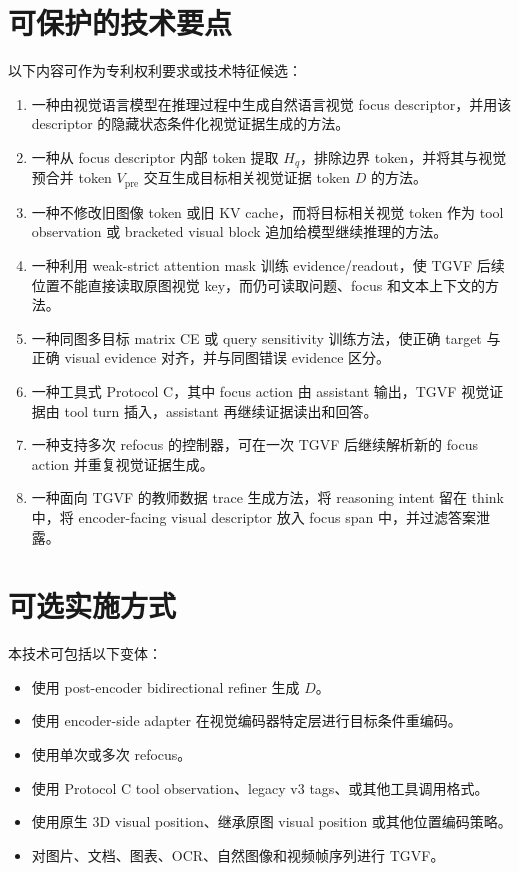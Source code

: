 \documentclass[10pt,twocolumn]{ctexart}
\begin{document}
\section{可保护的技术要点}

以下内容可作为专利权利要求或技术特征候选：

\begin{enumerate}
  \item 一种由视觉语言模型在推理过程中生成自然语言视觉 focus descriptor，并用该 descriptor 的隐藏状态条件化视觉证据生成的方法。
  \item 一种从 focus descriptor 内部 token 提取 $H_q$，排除边界 token，并将其与视觉预合并 token $V_{\mathrm{pre}}$ 交互生成目标相关视觉证据 token $D$ 的方法。
  \item 一种不修改旧图像 token 或旧 KV cache，而将目标相关视觉 token 作为 tool observation 或 bracketed visual block 追加给模型继续推理的方法。
  \item 一种利用 weak-strict attention mask 训练 evidence/readout，使 TGVF 后续位置不能直接读取原图视觉 key，而仍可读取问题、focus 和文本上下文的方法。
  \item 一种同图多目标 matrix CE 或 query sensitivity 训练方法，使正确 target 与正确 visual evidence 对齐，并与同图错误 evidence 区分。
  \item 一种工具式 Protocol C，其中 focus action 由 assistant 输出，TGVF 视觉证据由 tool turn 插入，assistant 再继续证据读出和回答。
  \item 一种支持多次 refocus 的控制器，可在一次 TGVF 后继续解析新的 focus action 并重复视觉证据生成。
  \item 一种面向 TGVF 的教师数据 trace 生成方法，将 reasoning intent 留在 think 中，将 encoder-facing visual descriptor 放入 focus span 中，并过滤答案泄露。
\end{enumerate}

\section{可选实施方式}

本技术可包括以下变体：

\begin{itemize}
  \item 使用 post-encoder bidirectional refiner 生成 $D$。
  \item 使用 encoder-side adapter 在视觉编码器特定层进行目标条件重编码。
  \item 使用单次或多次 refocus。
  \item 使用 Protocol C tool observation、legacy v3 tags、或其他工具调用格式。
  \item 使用原生 3D visual position、继承原图 visual position 或其他位置编码策略。
  \item 对图片、文档、图表、OCR、自然图像和视频帧序列进行 TGVF。
\end{itemize}
\end{document}

